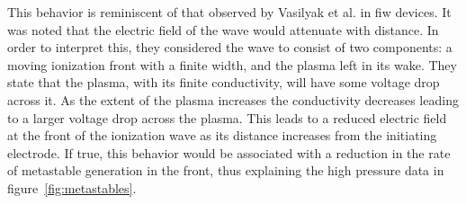 This behavior is reminiscent of that observed by Vasilyak et al.
\cite{Vasilyak1994} in \acs{fiw} devices. It was noted that the electric field
of the wave would attenuate with distance. In order to interpret this, they
considered the wave to consist of two components: a moving ionization front with
a finite width, and the plasma left in its wake. They state that the plasma,
with its finite conductivity, will have some voltage drop across it. As the
extent of the plasma increases the conductivity decreases leading to a larger
voltage drop across the plasma. This leads to a reduced electric field at the
front of the ionization wave as its distance increases from the initiating
electrode. If true, this behavior would be associated with a reduction in the
rate of metastable generation in the front, thus explaining the high pressure
data in figure~\ref{fig:metastables}.


